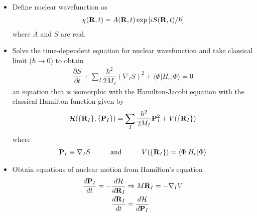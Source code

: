 \documentclass[slidestop,mathserif,compress,xcolor=svgnames]{beamer}
\begin{document}
\begin{frame}
\begin{itemize}
\item Define nuclear wavefunction as
\begin{align*}
\chi({\bf R},t) = A({\bf R},t)\exp\left[iS({\bf R},t)/\hbar\right]
\end{align*}
where $A$ and $S$ are real.
\item Solve the time-dependent equation for nuclear wavefunction and take classical limit ($\hbar\rightarrow0$) to obtain 
\begin{align*}
\dfrac{\partial S}{\partial t} + \sum_I\dfrac{\hbar^2}{2M_I}(\nabla_IS)^2 + \langle\Phi|H_e|\Phi\rangle = 0
\end{align*}
an equation that is isomorphic with the Hamilton-Jacobi equation with the classical Hamilton function given by
\begin{align*}
\mathcal{H}(\{{\bf R}_I\},\{{\bf P}_I\}) = \sum_I \dfrac{\hbar^2}{2M_I}{\bf P}^2_I + V(\{{\bf R}_I\})
\end{align*}
where
\begin{align*}
{\bf P}_I \equiv \nabla_IS\hspace{1cm}\mathrm{and}\hspace{1cm}
V(\{{\bf R}_I\}) = \langle\Phi|H_e|\Phi\rangle
\end{align*}
\item Obtain equations of nuclear motion from Hamilton's equation
\begin{align*}
\dfrac{d{\bf P}_I}{dt} = -\dfrac{d\mathcal{H}}{d{\bf R}_I}&\Rightarrow M\ddot{\bf R}_I = -\nabla _IV\\
\dfrac{d{\bf R}_I}{dt} &= \dfrac{d\mathcal{H}}{d{\bf P}_I}
\end{align*}
\end{itemize}
\end{frame}
\end{document}
